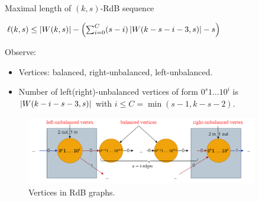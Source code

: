 \begin{frame}{Maximal length of $(k,s)$-RdB sequence}
    \begin{lemma}
        \centering
        $\ell(k,s)\leq\left \lvert W(k,s) \right \rvert - \left(\sum_{i=0}^{C}(s-i)\left \lvert W(k-s-i-3,s) \right \rvert-s\right) $
    \end{lemma}
    Observe:
    \begin{itemize}
        \item Vertices: balanced, right-unbalanced, left-unbalanced.
        \item Number of left(right)-unbalanced vertices of form $0^{s}1\ldots10^{i}$ is $\left \lvert W(k-i-s-3,s) \right \rvert$ with $i\leq C=\min(s-1,k-s-2)$.
    \end{itemize}
    \begin{figure}
        \centering
        \includegraphics[width=0.9\textwidth,height=.3\textheight]{Images/Rate/sketchproof.png}
        \caption{Vertices in RdB graphs.}
        \label{fig:sketchproof}
    \end{figure}
\end{frame}